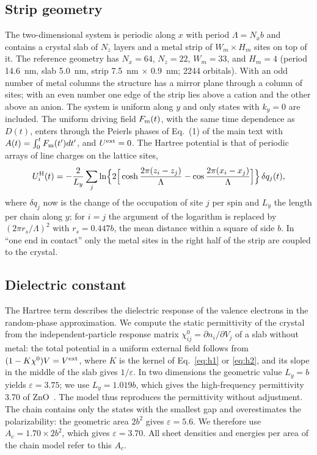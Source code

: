 \documentclass[aps,prl,onecolumn,superscriptaddress,notitlepage]{revtex4-2}
\begin{document}
\subsection{Strip geometry}
The two-dimensional system is periodic along $x$ with period $\Lambda=N_xb$ and contains a crystal
slab of $N_z$ layers and a metal strip of $W_m\times H_m$ sites on top of it. The reference geometry
has $N_x=64$, $N_z=22$, $W_m=33$, and $H_m=4$ (period 14.6~nm, slab 5.0~nm, strip
7.5~nm $\times$ 0.9~nm; 2244 orbitals). With an odd number of metal columns the structure has
a mirror plane through a column of sites; with an even number one edge of the strip lies above a
cation and the other above an anion. The system is uniform along $y$ and only states with
$k_y=0$ are included. The uniform driving field $F_{\rm m}(t)$, with the same time dependence as
$D(t)$, enters through the Peierls phases of Eq.~(1) of the main text with
$A(t)=\int_0^tF_{\rm m}(t')dt'$, and $U^{\rm ext}=0$. The Hartree potential is that of periodic
arrays of line charges on the lattice sites,
\begin{equation}
U^{\rm H}_i(t)=-\frac{2}{L_y}\sum_j\ln\!\Big\{2\Big[\cosh\frac{2\pi(z_i-z_j)}{\Lambda}-\cos\frac{2\pi(x_i-x_j)}{\Lambda}\Big]\Big\}\,\delta q_j(t),
\label{eq:h2}
\end{equation}
where $\delta q_j$ now is the change of the occupation of site $j$ per spin and $L_y$ the length per
chain along $y$; for $i=j$ the argument of the logarithm is replaced by $(2\pi r_s/\Lambda)^2$ with
$r_s=0.447b$, the mean distance within a square of side $b$. In ``one end in contact'' only the metal
sites in the right half of the strip are coupled to the crystal.

\subsection{Dielectric constant}
\label{sec:eps}
The Hartree term describes the dielectric response of the valence electrons in the random-phase
approximation. We compute the static permittivity of the crystal from the independent-particle
response matrix $\chi^0_{ij}=\partial n_i/\partial V_j$ of a slab without metal: the total potential
in a uniform external field follows from $(1-K\chi^0)V=V^{\rm ext}$, where $K$ is the kernel of
Eq.~\eqref{eq:h1} or \eqref{eq:h2}, and its slope in the middle of the slab gives $1/\varepsilon$. In
two dimensions the geometric value $L_y=b$ yields $\varepsilon=3.75$; we use $L_y=1.019b$, which
gives the high-frequency permittivity 3.70 of ZnO~\cite{ozgur2005}. The model thus reproduces the
permittivity without adjustment. The chain contains only the states with the smallest gap and
overestimates the polarizability: the geometric area $2b^2$ gives $\varepsilon=5.6$. We therefore use
$A_c=1.70\times2b^2$, which gives $\varepsilon=3.70$. All sheet densities and energies per area of
the chain model refer to this $A_c$.
\end{document}
